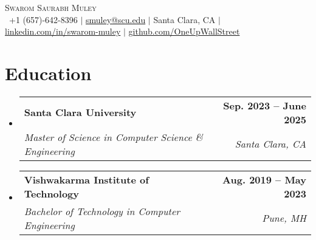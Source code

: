 \documentclass[letterpaper,11pt]{article}
\makeatletter
\newcommand{\resumeSubheading}[4]{
  \vspace{-2pt}\item
    \begin{tabular*}{1.0\textwidth}[t]{l@{\extracolsep{\fill}}r}
      \textbf{#1} & \textbf{\small #2} \\
      \textit{\small#3} & \textit{\small #4} \\
    \end{tabular*}\vspace{-7pt}
}
\newcommand{\resumeSubHeadingListStart}{\begin{itemize}[leftmargin=0.0in, label={}]}
\newcommand{\resumeSubHeadingListEnd}{\end{itemize}}
\makeatother
\begin{document}

\begin{center}
    {\scshape Swarom Saurabh Muley} \\ \vspace{1pt}
    \small \ +1 (657)-642-8396  $\vert$  \href{mailto:smuley@scu.edu}{smuley@scu.edu} $\vert$ Santa Clara, CA  $\vert$
    \href{https://www.linkedin.com/in/swarom-muley/}{{linkedin.com/in/swarom-muley}} $\vert$ 
    \href{https://github.com/OneUpWallStreet}{github.com/OneUpWallStreet}
    \vspace{-8pt}
\end{center}


\section{Education}
  \resumeSubHeadingListStart
    \resumeSubheading
      {Santa Clara University}{Sep. 2023 -- June 2025}
      {Master of Science in Computer Science \& Engineering}{Santa Clara, CA}

    \resumeSubheading
      {Vishwakarma Institute of Technology}{Aug. 2019 -- May 2023}
      {Bachelor of Technology in Computer Engineering}{Pune, MH}
  \resumeSubHeadingListEnd

\end{document}
